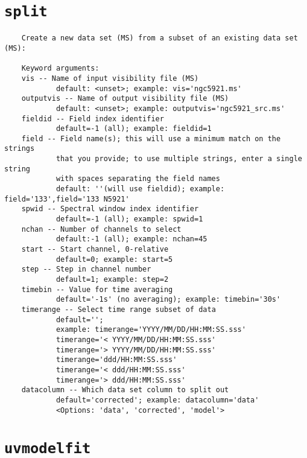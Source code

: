 \section{{\tt split}}
\label{section:tasks.split}

\small
\begin{verbatim}
    Create a new data set (MS) from a subset of an existing data set (MS):
    
    Keyword arguments:
    vis -- Name of input visibility file (MS)
            default: <unset>; example: vis='ngc5921.ms'
    outputvis -- Name of output visibility file (MS)
            default: <unset>; example: outputvis='ngc5921_src.ms'
    fieldid -- Field index identifier
            default=-1 (all); example: fieldid=1
    field -- Field name(s); this will use a minimum match on the strings
            that you provide; to use multiple strings, enter a single string
            with spaces separating the field names
            default: ''(will use fieldid); example: field='133',field='133 N5921'
    spwid -- Spectral window index identifier
            default=-1 (all); example: spwid=1
    nchan -- Number of channels to select
            default:-1 (all); example: nchan=45
    start -- Start channel, 0-relative
            default=0; example: start=5
    step -- Step in channel number
            default=1; example: step=2      
    timebin -- Value for time averaging
            default='-1s' (no averaging); example: timebin='30s'
    timerange -- Select time range subset of data
            default=''; 
            example: timerange='YYYY/MM/DD/HH:MM:SS.sss'
            timerange='< YYYY/MM/DD/HH:MM:SS.sss'
            timerange='> YYYY/MM/DD/HH:MM:SS.sss'
            timerange='ddd/HH:MM:SS.sss'
            timerange='< ddd/HH:MM:SS.sss'
            timerange='> ddd/HH:MM:SS.sss'
    datacolumn -- Which data set column to split out
            default='corrected'; example: datacolumn='data'
            <Options: 'data', 'corrected', 'model'>
\end{verbatim}
\normalsize


\section{{\tt uvmodelfit}}
\label{section:tasks.uvmodelfit}

